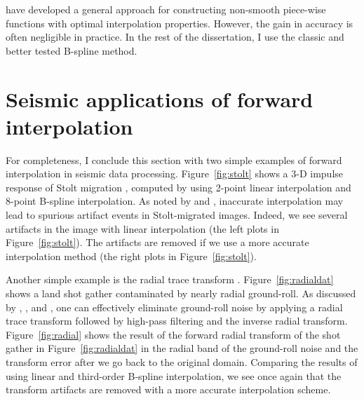 \par
\cite{mom} have developed a general approach for constructing
non-smooth piece-wise functions with optimal interpolation properties.
However, the gain in accuracy is often negligible in practice. In the
rest of the dissertation, I use the classic and better tested B-spline
method.

\section{Seismic applications of forward interpolation}


For completeness, I conclude this section with two simple examples of
forward interpolation in seismic data processing.
Figure~\ref{fig:stolt} shows a 3-D impulse response of Stolt migration
\cite[]{GEO43-01-00230048}, computed by using 2-point linear
interpolation and 8-point B-spline interpolation. As noted by
\cite{Ronen.sep.30.95} and \cite{Harlan.sep.30.103},
inaccurate interpolation may lead to spurious artifact events in
Stolt-migrated images. Indeed, we see several artifacts in the image
with linear interpolation (the left plots in Figure~\ref{fig:stolt}).
The artifacts are removed if we use a more accurate interpolation
method (the right plots in Figure~\ref{fig:stolt}).



\par
Another simple example is the radial trace transform
\cite[]{Ottolini.sepphd.33}. Figure~\ref{fig:radialdat} shows a land
shot gather contaminated by nearly radial ground-roll. As discussed by
\cite{Claerbout.sep.35.43}, \cite{SEG-1999-12041207,SEG-2000-21112114}, and
\cite{Brown.sep.103.morgan1,SEG-2000-21152118}, one can effectively
eliminate ground-roll noise by applying a radial trace transform
followed by high-pass filtering and the inverse radial transform.
Figure~\ref{fig:radial} shows the result of the forward radial
transform of the shot gather in Figure~\ref{fig:radialdat} in the
radial band of the ground-roll noise and the transform error after we
go back to the original domain. Comparing the results of using linear
and third-order B-spline interpolation, we see once again that the
transform artifacts are removed with a more accurate interpolation
scheme.

